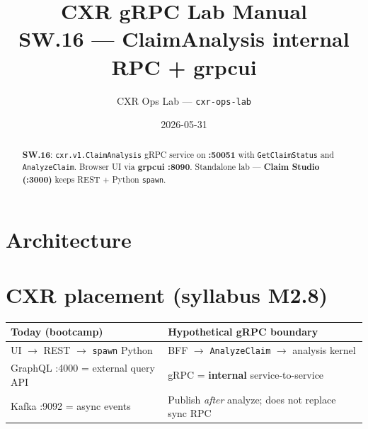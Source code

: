 \documentclass[11pt,a4paper]{report}
\title{CXR gRPC Lab Manual\\
\large SW.16 --- ClaimAnalysis internal RPC + grpcui}
\author{CXR Ops Lab --- \texttt{cxr-ops-lab}}
\date{2026-05-31}
\begin{document}
\maketitle
\begin{abstract}
\textbf{SW.16}: \texttt{cxr.v1.ClaimAnalysis} gRPC service on \textbf{:50051} with
\texttt{GetClaimStatus} and \texttt{AnalyzeClaim}. Browser UI via \textbf{grpcui :8090}.
Standalone lab --- \textbf{Claim Studio (:3000)} keeps REST + Python \texttt{spawn}.
\end{abstract}
\tableofcontents
\newpage

\chapter{Architecture}

\begin{center}
\end{center}

\chapter{CXR placement (syllabus M2.8)}

\begin{center}
\begin{tabular}{ll}
\toprule
Today (bootcamp) & Hypothetical gRPC boundary \\
\midrule
UI $\rightarrow$ REST $\rightarrow$ \texttt{spawn} Python & BFF $\rightarrow$ \texttt{AnalyzeClaim} $\rightarrow$ analysis kernel \\
GraphQL :4000 = external query API & gRPC = \textbf{internal} service-to-service \\
Kafka :9092 = async events & Publish \emph{after} analyze; does not replace sync RPC \\
\bottomrule
\end{tabular}
\end{center}
\end{document}
